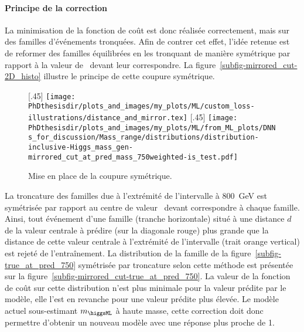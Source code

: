 \paragraph{Principe de la correction}
La minimisation de la fonction de coût est donc réalisée correctement, mais sur des familles d'événements tronquées.
Afin de contrer cet effet,
l'idée retenue est de reformer des familles équilibrées
en les tronquant de manière symétrique par rapport à la valeur de \ytrue\ devant leur correspondre.
La figure~\ref{subfig-mirrored_cut-2D_histo} illustre le principe de cette coupure symétrique.
\begin{figure}[h]
\centering

[.45\textwidth]
{\texttt{[image: \\PhDthesisdir/plots\_and\_images/my\_plots/ML/custom\_loss-illustrations/distance\_and\_mirror.tex]}\vspace{-.5\baselineskip}}
\hfill
{}[.45\textwidth]
{\texttt{[image: \\PhDthesisdir/plots\_and\_images/my\_plots/ML/from\_ML\_plots/DNNs\_for\_discussion/Mass\_range/distributions/distribution-inclusive-Higgs\_mass\_gen-mirrored\_cut\_at\_pred\_mass\_750weighted-is\_test.pdf]}\vspace{-.5\baselineskip}}

\caption{Mise en place de la coupure symétrique.}
\label{fig-B-boundaries_effect-mirrored_cut}
\end{figure}
\par
La troncature des familles due à l'extrémité de l'intervalle à \SI{800}{\GeV}
est symétrisée par rapport au centre de valeur \ytrue\ devant correspondre à chaque famille.
Ainsi, tout événement d'une famille (tranche horizontale)
situé à une distance $d$ de la valeur centrale à prédire (sur la diagonale rouge)
plus grande que la distance de cette valeur centrale à
l'extrémité de l'intervalle (trait orange vertical)
est rejeté de l'entraînement.
La distribution de la famille de la figure~\ref{subfig-true_at_pred_750}
symétrisée par troncature selon cette méthode est présentée sur la figure~\ref{subfig-mirrored_cut-true_at_pred_750}.
La valeur de la fonction de coût sur cette distribution n'est plus minimale pour la valeur prédite par le modèle,
elle l'est en revanche pour une valeur prédite plus élevée.
Le modèle actuel sous-estimant $m_{\higgsML}$ à haute masse,
cette correction doit donc permettre d'obtenir un nouveau modèle avec une réponse plus proche de 1.

